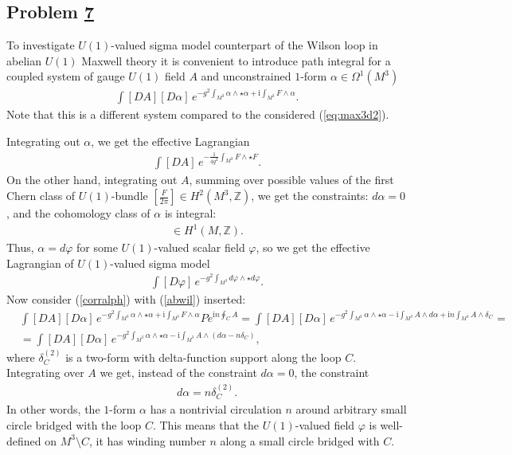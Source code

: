 \documentclass[12pt]{article}
\numberwithin{equation}{section}
\theoremstyle{definition}
\newcommand {\ii} {\mathrm{i}}
\newcommand{\myhref}[2]{\hyperref[#1]{#2}}%
\begin{document}
\subsection{Problem \myhref{prob7}{7}}
To investigate $U(1)$-valued sigma model counterpart of the Wilson loop in abelian $U(1)$ Maxwell theory it is convenient to introduce path integral for a coupled system of gauge $U(1)$ field $A$ and unconstrained $1$-form $\alpha \in \Omega^{1}(M^{3})$
\begin{align}\label{corralph}
    \int[DA][D\alpha] \, e^{-g^{2}\int_{M^{3}}\alpha \wedge \star \alpha + \ii \int_{M^{3}}F \wedge \alpha}.
\end{align}
Note that this is a different system compared to the considered (\ref{eq:max3d2}).

Integrating out $\alpha$, we get the effective Lagrangian
\begin{align*}
    \int[DA] \, e^{-\frac{1}{4g^{2}}\int_{M^{3}}F \wedge \star F }.
\end{align*}
On the other hand, integrating out $A$, summing over possible values of the first Chern class of $U(1)$-bundle $[\frac{F}{2\pi}] \in H^{2}(M^{3}, \mathbb{Z})$, we get the constraints: $d\alpha = 0$, and the cohomology class of $\alpha$ is integral:
\begin{align*}
    [\alpha] \in H^{1}(M, \mathbb{Z}).
\end{align*}
Thus, $\alpha = d {\varphi}$ for some $U(1)$-valued scalar field ${\varphi}$, so we get the effective Lagrangian of $U(1)$-valued sigma model
\begin{align*}
     \int[D{\varphi}] \, e^{-g^{2}\int_{M^{3}}d{\varphi} \wedge \star d{\varphi} }.
\end{align*}
Now consider (\ref{corralph}) with (\ref{abwil}) inserted:
\begin{align*}
     &\int[DA][D\alpha] \, e^{-g^{2}\int_{M^{3}}\alpha \wedge \star \alpha + \ii \int_{M^{3}}F \wedge \alpha} P e^{\ii n \oint_{C}A} 
     =\int[DA][D\alpha] \, e^{-g^{2}\int_{M^{3}}\alpha \wedge \star \alpha - \ii \int_{M^{3}}A \wedge d\alpha + \ii n \int_{M^{3}}A \wedge \delta_{C}}=\\
     &=\int[DA][D\alpha] \, e^{-g^{2}\int_{M^{3}}\alpha \wedge \star \alpha - \ii \int_{M^{3}}A \wedge (d\alpha -n \delta_{C}) },
\end{align*}
where $\delta^{(2)}_{C}$ is a two-form with delta-function support along the loop $C$. Integrating over $A$ we get, instead of the constraint $d\alpha = 0$, the constraint
\begin{align*}
    d\alpha = n \delta^{(2)}_{C}.
\end{align*}
In other words, the $1$-form $\alpha$ has a nontrivial circulation $n$ around arbitrary small circle bridged with the loop $C$. This means that the $U(1)$-valued field $\varphi$ is well-defined on $M^{3} \setminus C$, it has winding number $n$ along a small circle bridged with $C$.  
\end{document}
